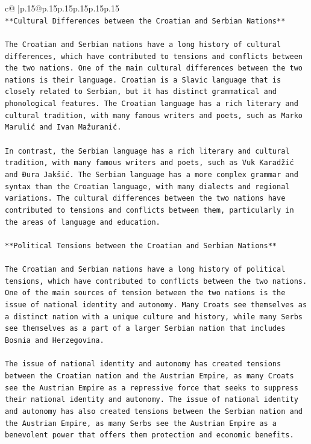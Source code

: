 \documentclass{article}
\begin{document}
{\begin{supertabular}{c@{$\;$}|p{.15\linewidth}@{}p{.15\linewidth}p{.15\linewidth}p{.15\linewidth}p{.15\linewidth}p{.15\linewidth}}
{{{\\ 
\texttt{**Cultural Differences between the Croatian and Serbian Nations**} \\
\\ 
\texttt{The Croatian and Serbian nations have a long history of cultural differences, which have contributed to tensions and conflicts between the two nations. One of the main cultural differences between the two nations is their language. Croatian is a Slavic language that is closely related to Serbian, but it has distinct grammatical and phonological features. The Croatian language has a rich literary and cultural tradition, with many famous writers and poets, such as Marko Marulić and Ivan Mažuranić.} \\
\\ 
\texttt{In contrast, the Serbian language has a rich literary and cultural tradition, with many famous writers and poets, such as Vuk Karadžić and Đura Jakšić. The Serbian language has a more complex grammar and syntax than the Croatian language, with many dialects and regional variations. The cultural differences between the two nations have contributed to tensions and conflicts between them, particularly in the areas of language and education.} \\
\\ 
\texttt{**Political Tensions between the Croatian and Serbian Nations**} \\
\\ 
\texttt{The Croatian and Serbian nations have a long history of political tensions, which have contributed to conflicts between the two nations. One of the main sources of tension between the two nations is the issue of national identity and autonomy. Many Croats see themselves as a distinct nation with a unique culture and history, while many Serbs see themselves as a part of a larger Serbian nation that includes Bosnia and Herzegovina.} \\
\\ 
\texttt{The issue of national identity and autonomy has created tensions between the Croatian nation and the Austrian Empire, as many Croats see the Austrian Empire as a repressive force that seeks to suppress their national identity and autonomy. The issue of national identity and autonomy has also created tensions between the Serbian nation and the Austrian Empire, as many Serbs see the Austrian Empire as a benevolent power that offers them protection and economic benefits.} \\
\\ 
}}}
\end{supertabular}}
\end{document}

